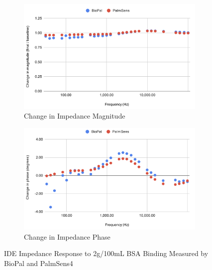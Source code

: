 \begin{figure}[H]
    \centering
    \begin{subfigure}{0.48\textwidth}
        \includegraphics[width=\textwidth]{2g:100mL mag.png}
        \caption{Change in Impedance Magnitude}
        \label{fig:2g_mag}
    \end{subfigure}
    \hfill
    \begin{subfigure}{0.48\textwidth}
        \includegraphics[width=\textwidth]{2g:100mL phase.png}
        \caption{Change in Impedance Phase}
        \label{fig:2g_phase}
    \end{subfigure}
    \caption{IDE Impedance Response to 2g/100mL BSA Binding Measured by BioPal and PalmSens4}
    \label{fig:2g_bsa_comparison}
\end{figure}

